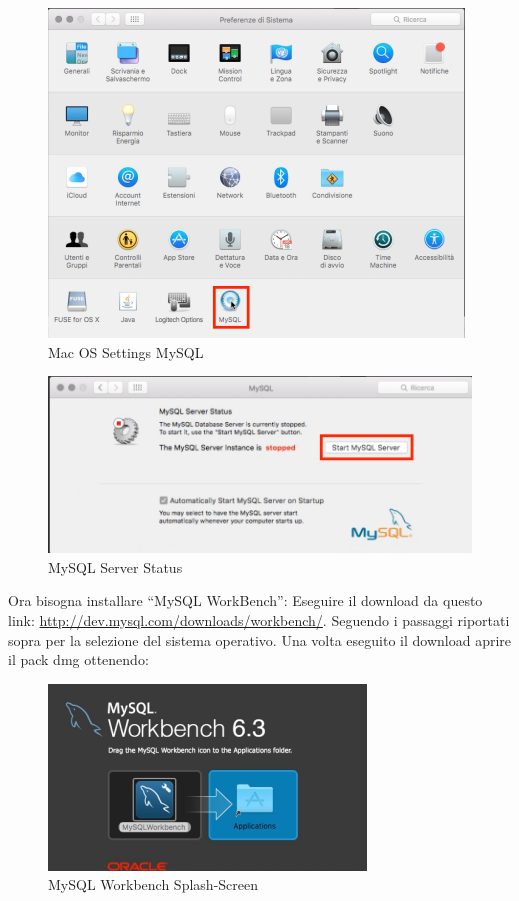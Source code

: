 \begin{itemize}
\begin{center}
\begin{figure}[H]
\centering
\includegraphics[scale=1]{figures/macOS_mySQL_settings.png}
\caption{Mac OS Settings MySQL}
\end{figure}
\end{center}

\begin{center}
\begin{figure}[H]
\centering
\includegraphics[scale=1]{figures/mySQL_serverstatus.png}
\caption{MySQL Server Status}
\end{figure}
\end{center}
\newpage

Ora bisogna installare “MySQL WorkBench”: Eseguire il download da questo link: \url{http://dev.mysql.com/downloads/workbench/}. Seguendo i passaggi riportati sopra per la selezione del sistema operativo. Una volta eseguito il download aprire il pack dmg ottenendo: 

\begin{center}
\begin{figure}[H]
\centering
\includegraphics[scale=1]{figures/mySQL_workbench_splash.png}
\caption{MySQL Workbench Splash-Screen}
\end{figure}
\end{center}


\end{itemize}
